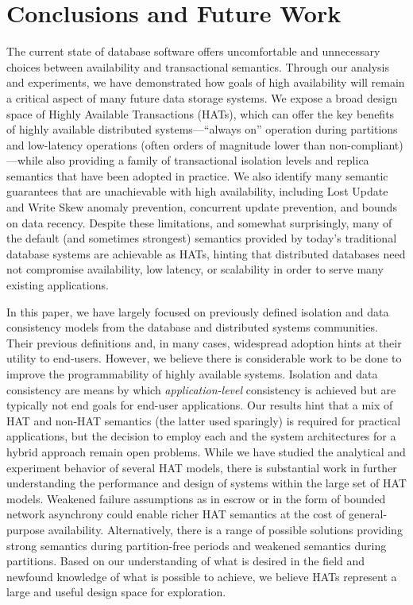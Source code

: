 
\section{Conclusions and Future Work}
\label{sec:conclusion}

The current state of database software offers uncomfortable and
unnecessary choices between availability and transactional semantics.
Through our analysis and experiments, we have demonstrated how goals
of high availability will remain a critical aspect of many future data
storage systems. We expose a broad design space of Highly Available
Transactions (HATs), which can offer the key benefits of highly
available distributed systems---``always on'' operation during
partitions and low-latency operations (often orders of magnitude lower
than non-compliant)---while also providing a family of transactional
isolation levels and replica semantics that have been adopted in
practice.  We also identify many semantic guarantees that are
unachievable with high availability, including Lost Update and Write
Skew anomaly prevention, concurrent update prevention, and bounds on
data recency. Despite these limitations, and somewhat surprisingly,
many of the default (and sometimes strongest) semantics provided by
today's traditional database systems are achievable as HATs, hinting
that distributed databases need not compromise availability, low
latency, or scalability in order to serve many existing applications.

In this paper, we have largely focused on previously defined isolation
and data consistency models from the database and
distributed systems communities. Their previous definitions and, in
many cases, widespread adoption hints at their utility to
end-users. However, we believe there is considerable work to be done
to improve the programmability of highly available systems. Isolation
and data consistency are means by which \textit{application-level}
consistency is achieved but are typically not end goals for end-user
applications. Our results hint that a mix of HAT and non-HAT semantics
(the latter used sparingly) is required for practical applications,
but the decision to employ each and the system architectures for a
hybrid approach remain open problems. While we have studied the
analytical and experiment behavior of several HAT models, there is
substantial work in further understanding the performance and design
of systems within the large set of HAT models. Weakened failure
assumptions as in escrow or in the form of bounded network asynchrony
could enable richer HAT semantics at the cost of general-purpose
availability. Alternatively, there is a range of possible solutions
providing strong semantics during partition-free periods and weakened
semantics during partitions. Based on our understanding of what is
desired in the field and newfound knowledge of what is possible to
achieve, we believe HATs represent a large and useful design space for
exploration.

